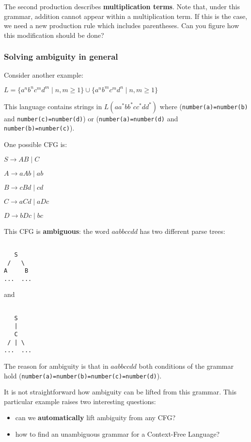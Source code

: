 \documentclass[a4paper, 12pt]{article}
\begin{document}
The second production describes \textbf{multiplication terms}. Note that, under this grammar, addition cannot appear within a multiplication term. If this is the case, we need a new production rule which includes parentheses. Can you figure how this modification should be done?

\subsubsection{ Solving ambiguity in general }

Consider another example:

$L = \{a^nb^nc^md^m \mid n,m\geq 1\} \cup \{a^nb^mc^md^n \mid n,m\geq 1\}$

This language contains strings in $L(aa^*bb^*cc^*dd^*)$ where (\texttt{number(a)=number(b)} and \texttt{number(c)=number(d)}) or (\texttt{number(a)=number(d)} and \texttt{number(b)=number(c)}).

One possible CFG is:

$S\rightarrow AB \mid C$

$A\rightarrow aAb \mid ab$

$B\rightarrow cBd \mid cd$

$C\rightarrow aCd \mid aDc$

$D\rightarrow bDc \mid bc$

This CFG is \textbf{ambiguous}: the word $aabbccdd$ has two different parse trees:

\begin{verbatim}

   S
 /   \
A     B
...  ...

\end{verbatim}


and 


\begin{verbatim}

   S
   |
   C
 / | \
...  ...

\end{verbatim}


The reason for ambiguity is that in $aabbccdd$ both conditions of the grammar hold (\texttt{number(a)=number(b)=number(c)=number(d)}).

It is not straightforward how ambiguity can be lifted from this grammar. This particular example raises two interesting questions:
  \begin{itemize}
  	\item  can we \textbf{automatically} lift ambiguity from any CFG?
  	\item  how to find an unambiguous grammar for a Context-Free Language?
  \end{itemize}
\end{document}
